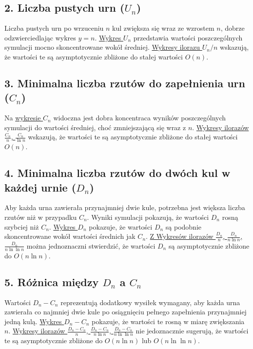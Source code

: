 \documentclass{article}
\begin{document}
\subsection*{2. Liczba pustych urn ($U_n$)}
Liczba pustych urn po wrzuceniu $n$ kul zwiększa się wraz ze wzrostem $n$, dobrze odzwierciedlając wykres $y=n$. \hyperref[fig:WykresUn]{Wykres $U_n$} przedstawia wartości poszczególnych symulacji mocno skoncentrowane wokół średniej. \hyperref[fig:WykresUnratio]{Wykresy ilorazu $U_n/n$} wskazują, że wartości te są asymptotycznie zbliżone do stałej wartości $O(n)$.

\subsection*{3. Minimalna liczba rzutów do zapełnienia urn ($C_n$)}
Na \hyperref[fig:WykresCn]{wykresie $C_n$} widoczna jest dobra koncentraca wyników poszczególnych symulacji do wartości średniej, choć zmniejszającą się wraz z $n$. \hyperref[fig:WykresCnratio]{Wykresy ilorazów $\frac{C_n}{n}$, $\frac{C_n}{\ln n}$} wskazują, że wartości te są asymptotycznie zbliżone do stałej wartości $O(n)$.

\subsection*{4. Minimalna liczba rzutów do dwóch kul w każdej urnie ($D_n$)}
Aby każda urna zawierała przynajmniej dwie kule, potrzebna jest większa liczba rzutów niż w przypadku $C_n$. Wyniki symulacji pokazują, że wartości $D_n$ rosną szybciej niż $C_n$. \hyperref[fig:WykresDn]{Wykres $D_n$} pokazuje, że wartości $D_n$ są podobnie skoncentrowane wokół wartości średnich jak $C_n$. \hyperref[fig:WykresDnratio]{Z Wykresów ilorazów $\frac{D_n}{n}$, $\frac{D_n}{n \ln n}$, $\frac{D_n}{n \ln \ln n}$} można jednoznaczni stwierdzić, że wartości $D_n$ są asymptotycznie zbliżone do $O(n \ln n)$.

\subsection*{5. Różnica między $D_n$ a $C_n$}
Wartości $D_n - C_n$ reprezentują dodatkowy wysiłek wymagany, aby każda urna zawierała co najmniej dwie kule po osiągnięciu pełnego zapełnienia przynajmniej jedną kulą. \hyperref[fig:WykresDnCn]{Wykres $D_n - C_n$} pokazuje, że wartości te rosną w miarę zwiększania $n$. \hyperref[fig:WykresDn-Cn]{Wykresy ilorazów $\frac{D_n - C_n}{n}$, $\frac{D_n - C_n}{n \ln n}$, $\frac{D_n - C_n}{n \ln \ln n}$}  nie jedoznacznie sugerują, że wartości te są asymptotycznie zbliżone do $O(n \ln n)$ lub $O(n \ln \ln n)$.
\end{document}
